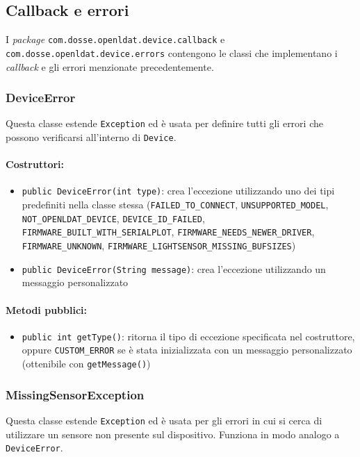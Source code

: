 \subsection{Callback e errori}
I \textit{package} \texttt{com.dosse.openldat.device.callback} e \texttt{com.dosse.openldat.device.errors} contengono le classi che implementano i \textit{callback} e gli errori menzionate precedentemente.

\subsubsection{DeviceError}
Questa classe estende \texttt{Exception} ed è usata per definire tutti gli errori che possono verificarsi all'interno di \texttt{Device}.

\paragraph{Costruttori:}\begin{itemize}
	\item \texttt{public DeviceError(int type)}: crea l'eccezione utilizzando uno dei tipi predefiniti nella classe stessa (\texttt{FAILED\_TO\_CONNECT}, \texttt{UNSUPPORTED\_MODEL}, \texttt{NOT\_OPENLDAT\_DEVICE}, \texttt{DEVICE\_ID\_FAILED}, \texttt{FIRMWARE\_BUILT\_WITH\_SERIALPLOT}, \texttt{FIRMWARE\_NEEDS\_NEWER\_DRIVER}, \texttt{FIRMWARE\_UNKNOWN}, \texttt{FIRMWARE\_LIGHTSENSOR\_MISSING\_BUFSIZES})
	\item \texttt{public DeviceError(String message)}: crea l'eccezione utilizzando un messaggio personalizzato
\end{itemize}

\paragraph{Metodi pubblici:}\begin{itemize}
	\item \texttt{public int getType()}: ritorna il tipo di eccezione specificata nel costruttore, oppure \texttt{CUSTOM\_ERROR} se è stata inizializzata con un messaggio personalizzato (ottenibile con \texttt{getMessage()})
\end{itemize}

\subsubsection{MissingSensorException}
Questa classe estende \texttt{Exception} ed è usata per gli errori in cui si cerca di utilizzare un sensore non presente sul dispositivo. Funziona in modo analogo a \texttt{DeviceError}.

